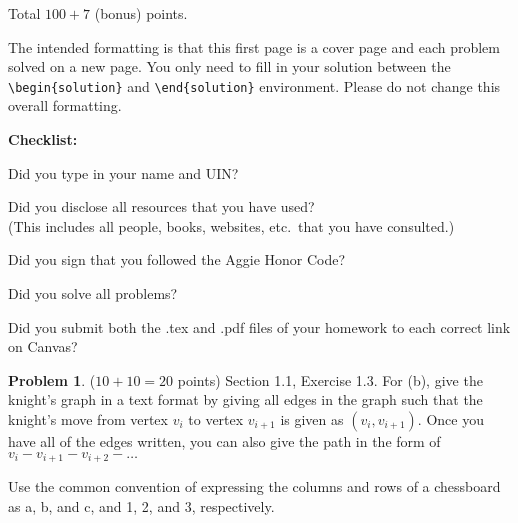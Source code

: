 \documentclass{article}
\theoremstyle{definition}
\newtheorem{problem}{Problem}
\newtheorem*{solution}{Solution}
\newcommand{\checklist}{\noindent\textbf{Checklist:}
\begin{compactitem}[$\Box$]
\item [\checkmark] Did you type in your name and UIN? 
\item [\checkmark] Did you disclose all resources that you have used? \\
(This includes all people, books, websites, etc.\ that you have consulted.)
\item [\checkmark] Did you sign that you followed the Aggie Honor Code? 
\item [\checkmark] Did you solve all problems? 
\item [\checkmark] Did you submit both the .tex and .pdf files of your homework to each correct link on Canvas? 
\end{compactitem}
}
\begin{document}
\bigskip

\noindent
Total $100 + 7$ (bonus) points.

\bigskip

\noindent
The intended formatting is that this first page is a cover page and each 
problem solved on a new page. You only need to fill in your solution between 
the \verb|\begin{solution}| and \verb|\end{solution}| environment.  
Please do not change this overall formatting.

\vfill
\checklist

\newpage
\begin{problem} ($10+10=20$ points) Section 1.1, Exercise 1.3.
For (b), give the knight's graph in a text format by giving all
edges in the graph such that the knight's move from vertex $v_i$ to 
vertex $v_{i+1}$ is given as $(v_i, v_{i+1})$.  Once you have all of the
edges written, you can also give the path in the form of 
$v_i - v_{i+1} - v_{i+2} - \ldots$

Use the common convention of expressing the columns and rows of
a chessboard as a, b, and c, and 1, 2, and 3, respectively.
\end{problem}
\end{document}
